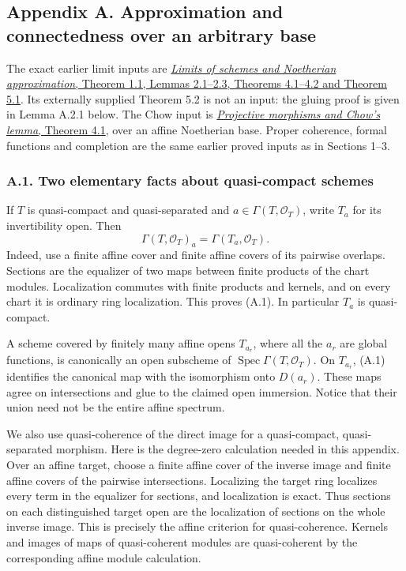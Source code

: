 \documentclass[11pt]{article}
\begin{document}
\subsection{Appendix A. Approximation and connectedness over an
arbitrary
base}\label{appendix-a.-approximation-and-connectedness-over-an-arbitrary-base}

The exact earlier limit inputs are
\href{../AG-GS/prerequisites/AG-MO/limits-and-noetherian-approximation.html}{\emph{Limits
of schemes and Noetherian approximation}, Theorem 1.1, Lemmas 2.1--2.3,
Theorems 4.1--4.2 and Theorem 5.1}. Its externally supplied Theorem 5.2
is not an input: the gluing proof is given in Lemma A.2.1 below. The
Chow input is
\href{../AG-GS/prerequisites/AG-MO/projective-morphisms-and-chows-lemma.html}{\emph{Projective
morphisms and Chow's lemma}, Theorem 4.1}, over an affine Noetherian
base. Proper coherence, formal functions and completion are the same
earlier proved inputs as in Sections 1--3.

\subsubsection{A.1. Two elementary facts about quasi-compact
schemes}\label{a.1.-two-elementary-facts-about-quasi-compact-schemes}

If \(T\) is quasi-compact and quasi-separated and
\(a\in\Gamma(T,\mathcal O_T)\), write \(T_a\) for its invertibility
open. Then \[
\Gamma(T,\mathcal O_T)_a=\Gamma(T_a,\mathcal O_T).
\tag{A.1}
\] Indeed, use a finite affine cover and finite affine covers of its
pairwise overlaps. Sections are the equalizer of two maps between finite
products of the chart modules. Localization commutes with finite
products and kernels, and on every chart it is ordinary ring
localization. This proves (A.1). In particular \(T_a\) is quasi-compact.

A scheme covered by finitely many affine opens \(T_{a_r}\), where all
the \(a_r\) are global functions, is canonically an open subscheme of
\(\operatorname{Spec}\Gamma(T,\mathcal O_T)\). On \(T_{a_r}\), (A.1)
identifies the canonical map with the isomorphism onto \(D(a_r)\). These
maps agree on intersections and glue to the claimed open immersion.
Notice that their union need not be the entire affine spectrum.

We also use quasi-coherence of the direct image for a quasi-compact,
quasi-separated morphism. Here is the degree-zero calculation needed in
this appendix. Over an affine target, choose a finite affine cover of
the inverse image and finite affine covers of the pairwise
intersections. Localizing the target ring localizes every term in the
equalizer for sections, and localization is exact. Thus sections on each
distinguished target open are the localization of sections on the whole
inverse image. This is precisely the affine criterion for
quasi-coherence. Kernels and images of maps of quasi-coherent modules
are quasi-coherent by the corresponding affine module calculation.
\end{document}
